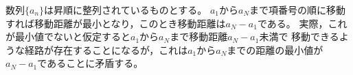 \documentclass{article}
\begin{document}
数列$\{a_n\}$は昇順に整列されているものとする。
$a_1$から$a_N$まで項番号の順に移動すれば移動距離が最小となり，このとき移動距離は$a_N - a_1$である。
実際，これが最小値でないと仮定すると$a_1$から$a_N$まで移動距離$a_N - a_1$未満で
移動できるような経路が存在することになるが，これは$a_1$から$a_N$までの距離の最小値が$a_N - a_1$であることに矛盾する。
\end{document}
